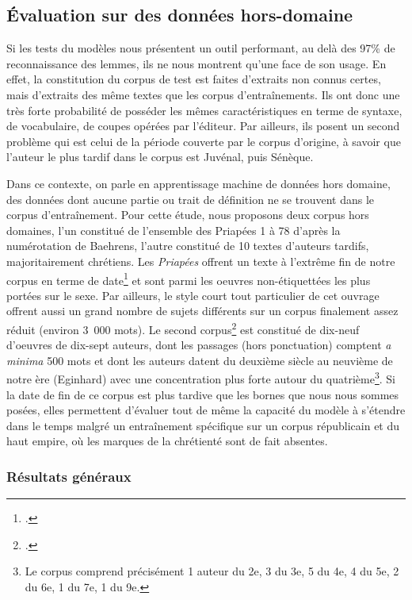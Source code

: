 \subsection{Évaluation sur des données hors-domaine}

Si les tests du modèles nous présentent un outil performant, au delà des 97\% de reconnaissance des lemmes, ils ne nous montrent qu'une face de son usage. En effet, la constitution du corpus de test est faites d'extraits non connus certes, mais d'extraits des même textes que les corpus d'entraînements. Ils ont donc une très forte probabilité de posséder les mêmes caractéristiques en terme de syntaxe, de vocabulaire, de coupes opérées par l'éditeur. Par ailleurs, ils posent un second problème qui est celui de la période couverte par le corpus d'origine, à savoir que l'auteur le plus tardif dans le corpus est Juvénal, puis Sénèque.

Dans ce contexte, on parle en apprentissage machine de données hors domaine, des données dont aucune partie ou trait de définition ne se trouvent dans le corpus d'entraînement. Pour cette étude, nous proposons deux corpus hors domaines, l'un constitué de l'ensemble des Priapées 1 à 78 d'après la numérotation de Baehrens, l'autre constitué de 10 textes d'auteurs tardifs, majoritairement chrétiens. Les \textit{Priapées} offrent un texte à l'extrême fin de notre corpus en terme de date\footcite{citroni_les_2008} et sont parmi les oeuvres non-étiquettées les plus portées sur le sexe. Par ailleurs, le style court tout particulier de cet ouvrage offrent aussi un grand nombre de sujets différents sur un corpus finalement assez réduit (environ 3~000 mots). Le second corpus\footcite{glaise_2020_corpus_tardif} est constitué de dix-neuf d'oeuvres de dix-sept auteurs, dont les passages (hors ponctuation) comptent \textit{a minima} 500 mots et dont les auteurs datent du deuxième siècle au neuvième de notre ère (Eginhard) avec une concentration plus forte autour du quatrième\footnote{Le corpus comprend précisément 1 auteur du 2e, 3 du 3e, 5 du 4e, 4 du 5e, 2 du 6e, 1 du 7e, 1 du 9e.}. Si la date de fin de ce corpus est plus tardive que les bornes que nous nous sommes posées, elles permettent d'évaluer tout de même la capacité du modèle à s'étendre dans le temps malgré un entraînement spécifique sur un corpus républicain et du haut empire, où les marques de la chrétienté sont de fait absentes.


\subsubsection{Résultats généraux}

